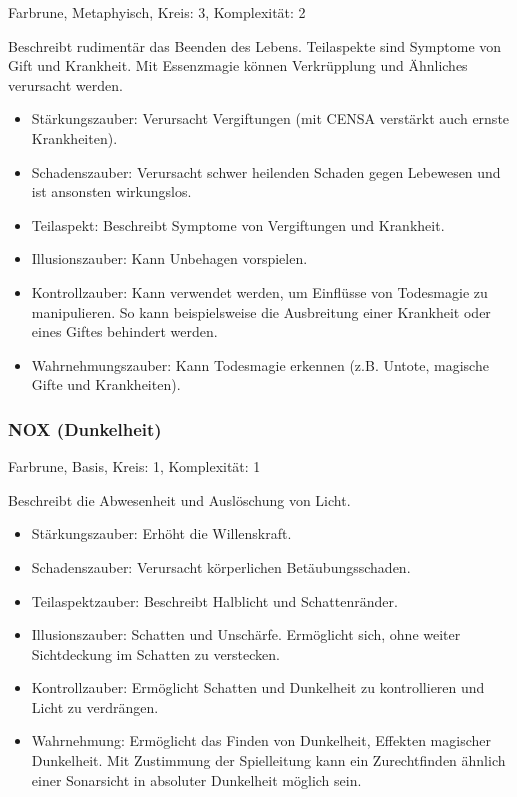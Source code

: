\documentclass{article}
\begin{document}
Farbrune, Metaphyisch, Kreis: 3, Komplexität: 2

Beschreibt rudimentär das Beenden des Lebens. Teilaspekte sind Symptome von Gift und Krankheit. Mit Essenzmagie können
Verkrüpplung und Ähnliches verursacht werden.

\begin{itemize}
\item Stärkungszauber: Verursacht Vergiftungen (mit CENSA verstärkt auch ernste Krankheiten).
\item Schadenszauber: Verursacht schwer heilenden Schaden gegen Lebewesen und ist ansonsten wirkungslos.
\item Teilaspekt: Beschreibt Symptome von Vergiftungen und Krankheit.
\item Illusionszauber: Kann Unbehagen vorspielen.
\item Kontrollzauber: Kann verwendet werden, um Einflüsse von Todesmagie zu manipulieren. So kann beispielsweise die Ausbreitung einer Krankheit oder eines Giftes behindert werden.
\item Wahrnehmungszauber: Kann Todesmagie erkennen (z.B. Untote, magische Gifte und Krankheiten).
\end{itemize}

\subsubsection{NOX (Dunkelheit)}

Farbrune, Basis, Kreis: 1, Komplexität: 1

Beschreibt die Abwesenheit und Auslöschung von Licht.

\begin{itemize}
\item Stärkungszauber: Erhöht die Willenskraft.
\item Schadenszauber: Verursacht körperlichen Betäubungsschaden.
\item Teilaspektzauber: Beschreibt Halblicht und Schattenränder.
\item Illusionszauber: Schatten und Unschärfe. Ermöglicht sich, ohne weiter Sichtdeckung im Schatten zu verstecken.
\item Kontrollzauber: Ermöglicht Schatten und Dunkelheit zu kontrollieren und Licht zu verdrängen.
\item Wahrnehmung: Ermöglicht das Finden von Dunkelheit, Effekten magischer Dunkelheit. Mit Zustimmung der Spielleitung kann ein Zurechtfinden ähnlich einer Sonarsicht in absoluter Dunkelheit möglich sein.
\end{itemize}
\end{document}
